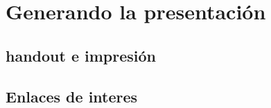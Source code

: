 \section{Generando la presentación}

\subsection{handout e impresión}
\subsection{Enlaces de interes}
